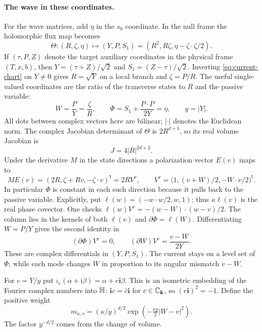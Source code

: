 \paragraph{The wave in these coordinates.}
For the wave matrices, add $\eta$ in the $s_0$ coordinate. In the
null frame the holomorphic flux map becomes
\begin{equation}\label{eq:current-chart}
 \Theta:(R,\zeta,\eta)\longmapsto
 (Y,P,S_1)=(R^2,R\zeta,\eta-\zeta\cdot\zeta/2).
\end{equation}
If $(\tau,P,Z)$ denote the target auxiliary coordinates in the physical frame $(T,x,b)$, then
$Y=(\tau+Z)/\sqrt2$ and $S_1=(Z-\tau)/\sqrt2$. Inverting
\eqref{eq:current-chart} on $Y\ne0$ gives $R=\sqrt Y$ on a local
branch and $\zeta=P/R$. The useful single-valued coordinates are the
ratio of the transverse states to $R$ and the passive variable:
\begin{equation}\label{eq:current-invariants}
 W=\frac P Y=\frac{\zeta}{R},\qquad
 \Phi=S_1+\frac{P\cdot P}{2Y}=\eta,\qquad y=|Y|.
\end{equation}
All dots between complex vectors here are bilinear; $|\cdot|$ denotes
the Euclidean norm. The complex Jacobian determinant of $\Theta$ is
$2R^{d+1}$, so its real volume Jacobian is
\begin{equation}\label{eq:current-volume}
 J=4|R|^{2d+2}.
\end{equation}
Under the derivative $M$ in the state directions a polarization vector
$E(v)$ maps to
\begin{equation}\label{eq:current-polarization}
 ME(v)=(2R,\zeta+Rv,-\zeta\cdot v)^{\mathsf t}=2R V^v,
 \qquad V^v=\big(1,(v+W)/2,-W\cdot v/2\big)^{\mathsf t}.
\end{equation}
In particular $\Phi$ is constant in each such direction because it
pulls back to the passive variable. Explicitly, put
$\ell(w)=(-w\cdot w/2,w,1)$; thus $\kappa\ell(v)$ is the real phase
covector. One checks
$\ell(w)V^v=-(w-W)\cdot(w-v)/2$. The column lies in the kernels of
both $\ell(v)$ and $\partial\Phi=\ell(W)$. Differentiating $W=P/Y$
gives the second identity in
\begin{equation}\label{eq:current-directions}
 (\partial\Phi)V^v=0,\qquad
 (\partial W)V^v=\frac{v-W}{2Y}.
\end{equation}
These are complex differentials in $(Y,P,S_1)$. The current stays
on a level set of $\Phi$, while each mode changes $W$ in proportion to
its angular mismatch $v-W$.

For $e=Y/y$ put
$\iota_e(\alpha+\mathrm i\beta)=\alpha+e\mathbf i\beta$.
This is an isometric embedding of the Fourier complex numbers into
$\mathbb H$: $\mathbf i c=\bar c\mathbf i$ for $c\in\mathbb C_{\mathbf k}$,
so $(e\mathbf i)^2=-1$. Define the positive weight
\[
 m_{\kappa,v}=(\kappa/y)^{d/2}
           \exp\!\left(-\tfrac{\kappa y}{2}|W-v|^2\right).
\]
The factor $y^{-d/2}$ comes from the change of volume.

